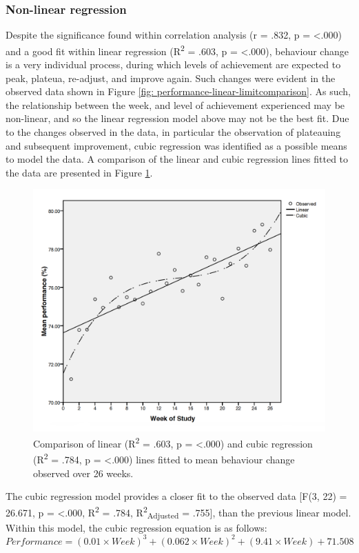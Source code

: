 \subsubsection{Non-linear regression}
Despite the significance found within correlation analysis (r = .832, p = \textless .000) and a good fit within linear regression (R\textsuperscript{2} = .603, p = \textless.000), behaviour change is a very individual process, during which levels of achievement are expected to peak, plateua, re-adjust, and improve again. Such changes were evident in the observed data shown in Figure \ref{fig: performance-linear-limitcomparison}. As such, the relationship between the week, and level of achievement experienced may be non-linear, and so the linear regression model above may not be the best fit. Due to the changes observed in the data, in particular the observation of plateauing and subsequent improvement, cubic regression was identified as a possible means to model the data. A comparison of the linear and cubic regression lines fitted to the data are presented in Figure \ref{fig: performance-cublic-linear-limited}.
 \begin{figure}[h]
    \centering
    \includegraphics[scale=0.25, angle=0]{Files/prevention-study-3/figures/performance-cublic-linear-limited}
    \caption{Comparison of linear (R\textsuperscript{2} = .603, p = \textless.000) and cubic regression (R\textsuperscript{2} = .784, p = \textless.000) lines fitted to mean behaviour change observed over 26 weeks.}
    \label{fig: performance-cublic-linear-limited}
\end{figure}
The cubic regression model provides a closer fit to the observed data [F(3, 22) = 26.671, p = \textless.000, R\textsuperscript{2} = .784, R\textsuperscript{2}\textsubscript{Adjusted} = .755], than the previous linear model. Within this model, the cubic regression equation is as follows:
\begin{equation}
Performance = \left(0.01 \times Week\right)^{3} +  \left(0.062 \times Week\right)^{2} +  \left(9.41 \times Week \right) +  71.508
          \label{eq: calc-performance-notlimited-behaviour-change}
\end{equation}

